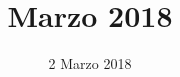 


\title{ Marzo 2018}
\author{\GroupName}

\date{2 Marzo 2018}



\makeFrontPage

    \frenchspacing

    


